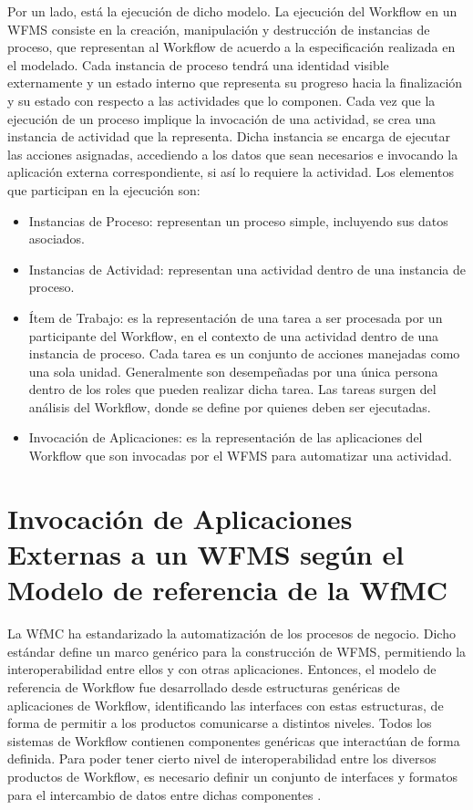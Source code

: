 Por un lado, está la ejecución de dicho modelo. La ejecución del Workflow en un WFMS consiste en la creación, manipulación y destrucción de instancias de proceso, que representan al Workflow de acuerdo a la especificación realizada en el modelado. Cada instancia de proceso tendrá una identidad visible externamente y un estado interno que representa su progreso hacia la finalización y su estado con respecto a las actividades que lo componen. Cada vez que la ejecución de un proceso implique la invocación de una actividad, se crea una instancia de actividad que la representa. Dicha instancia se encarga de ejecutar las acciones asignadas, accediendo a los datos que sean necesarios e invocando la aplicación externa correspondiente, si así lo requiere la actividad. Los elementos que participan en la ejecución son:

\begin{itemize}
	\item Instancias de Proceso: representan un proceso simple, incluyendo sus datos asociados.
	
	\item Instancias de Actividad: representan una actividad dentro de una instancia de proceso.
	
	\item Ítem de Trabajo: es la representación de una tarea a ser procesada por un participante del Workflow, en el contexto de una actividad dentro de una instancia de proceso. Cada tarea es un conjunto de acciones manejadas como una sola unidad. Generalmente son desempeñadas por una única persona dentro de los roles que pueden realizar dicha tarea. Las tareas surgen del análisis del Workflow, donde se define por quienes deben ser ejecutadas.
	
	\item Invocación de Aplicaciones: es la representación de las aplicaciones del Workflow que son invocadas por el WFMS para automatizar una actividad.
\end{itemize}

\section{Invocación de Aplicaciones Externas a un WFMS según el Modelo de referencia de la WfMC}
\label{Invocación de Aplicaciones Externas a un WFMS según el Modelo de referencia de la WfMC}

La WfMC ha estandarizado la automatización de los procesos de negocio. Dicho estándar define un marco genérico para la construcción de WFMS, permitiendo la interoperabilidad entre ellos y con otras aplicaciones. Entonces, el modelo de referencia de Workflow fue desarrollado desde estructuras genéricas de aplicaciones de Workflow, identificando las interfaces con estas estructuras, de forma de permitir a los productos comunicarse a distintos niveles. Todos los sistemas de Workflow contienen componentes genéricas que interactúan de forma definida. Para poder tener cierto nivel de interoperabilidad entre los diversos productos de Workflow, es necesario definir un conjunto de interfaces y formatos para el intercambio de datos entre dichas componentes \cite{WfMC09}.\\


